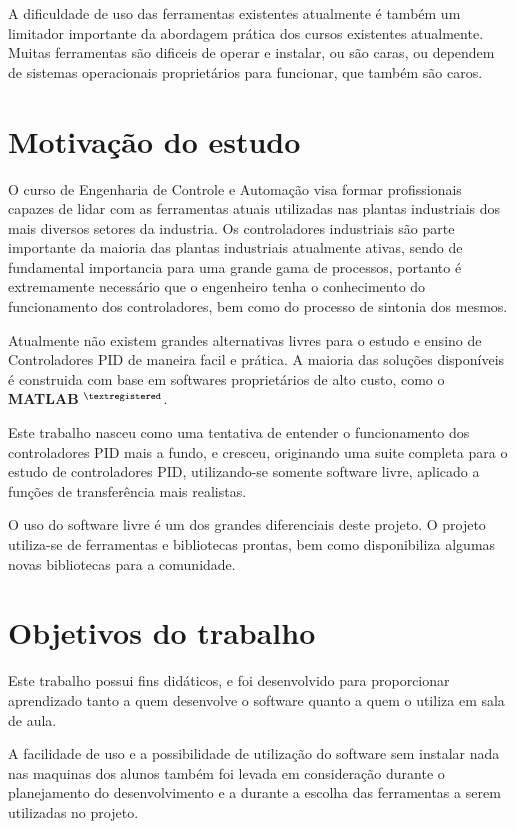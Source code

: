     A dificuldade de uso das ferramentas existentes atualmente é também um limitador
    importante da abordagem prática dos cursos existentes atualmente. Muitas ferramentas
    são dificeis de operar e instalar, ou são caras, ou dependem de sistemas operacionais
    proprietários para funcionar, que também são caros.

\section{Motivação do estudo}

    O curso de Engenharia de Controle e Automação visa formar profissionais
    capazes de lidar com as ferramentas atuais utilizadas nas plantas industriais
    dos mais diversos setores da industria. Os controladores industriais são
    parte importante da maioria das plantas industriais atualmente ativas,
    sendo de fundamental importancia para uma grande gama de processos, portanto
    é extremamente necessário que o engenheiro tenha o conhecimento do funcionamento
    dos controladores, bem como do processo de sintonia dos mesmos.
    
    Atualmente não existem grandes alternativas livres para o estudo e ensino
    de Controladores PID de maneira facil e prática. A maioria das soluções
    disponíveis é construida com base em softwares proprietários de alto custo,
    como o \textbf{MATLAB} $^{\textregistered}$.
    
    Este trabalho nasceu como uma tentativa de entender o funcionamento dos
    controladores PID mais a fundo, e cresceu, originando uma suite completa
    para o estudo de controladores PID, utilizando-se somente software livre,
    aplicado a funções de transferência mais realistas.

    O uso do software livre é um dos grandes diferenciais deste projeto. O projeto
    utiliza-se de ferramentas e bibliotecas prontas, bem como disponibiliza algumas
    novas bibliotecas para a comunidade.

\section{Objetivos do trabalho}

    Este trabalho possui fins didáticos, e foi desenvolvido para proporcionar
    aprendizado tanto a quem desenvolve o software quanto a quem o utiliza em sala
    de aula.
    
    A facilidade de uso e a possibilidade de utilização do software sem instalar
    nada nas maquinas dos alunos também foi levada em consideração durante o
    planejamento do desenvolvimento e a durante a escolha das ferramentas a serem
    utilizadas no projeto.
    
